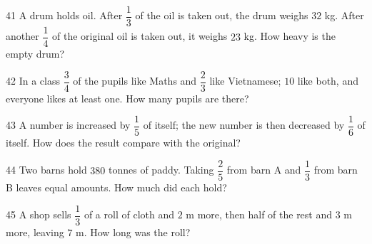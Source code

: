 \gap
\begin{probbox}{41}{}
A drum holds oil. After $\dfrac13$ of the oil is taken out, the drum weighs $32$ kg. After another $\dfrac14$ of the original oil is taken out, it weighs $23$ kg. How heavy is the empty drum?
\end{probbox}
\gap
\begin{probbox}{42}{}
In a class $\dfrac34$ of the pupils like Maths and $\dfrac23$ like Vietnamese; $10$ like both, and everyone likes at least one. How many pupils are there?
\end{probbox}
\gap
\begin{probbox}{43}{}
A number is increased by $\dfrac15$ of itself; the new number is then decreased by $\dfrac16$ of itself. How does the result compare with the original?
\end{probbox}
\gap
\begin{probbox}{44}{}
Two barns hold $380$ tonnes of paddy. Taking $\dfrac25$ from barn A and $\dfrac13$ from barn B leaves equal amounts. How much did each hold?
\end{probbox}
\gap
\begin{probbox}{45}{}
A shop sells $\dfrac13$ of a roll of cloth and $2$ m more, then half of the rest and $3$ m more, leaving $7$ m. How long was the roll?
\end{probbox}
